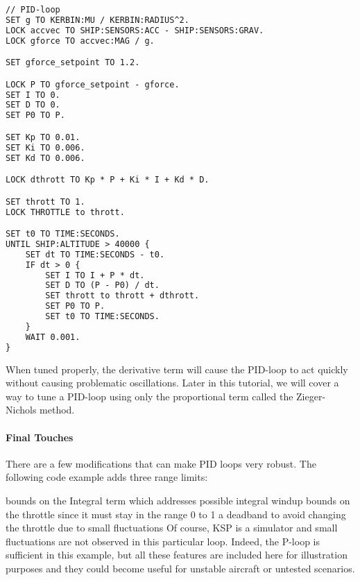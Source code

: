 \begin{lstlisting}[frame=single,language=XML]
// PID-loop
SET g TO KERBIN:MU / KERBIN:RADIUS^2.
LOCK accvec TO SHIP:SENSORS:ACC - SHIP:SENSORS:GRAV.
LOCK gforce TO accvec:MAG / g.

SET gforce_setpoint TO 1.2.

LOCK P TO gforce_setpoint - gforce.
SET I TO 0.
SET D TO 0.
SET P0 TO P.

SET Kp TO 0.01.
SET Ki TO 0.006.
SET Kd TO 0.006.

LOCK dthrott TO Kp * P + Ki * I + Kd * D.

SET thrott TO 1.
LOCK THROTTLE to thrott.

SET t0 TO TIME:SECONDS.
UNTIL SHIP:ALTITUDE > 40000 {
    SET dt TO TIME:SECONDS - t0.
    IF dt > 0 {
        SET I TO I + P * dt.
        SET D TO (P - P0) / dt.
        SET thrott to thrott + dthrott.
        SET P0 TO P.
        SET t0 TO TIME:SECONDS.
    }
    WAIT 0.001.
}
\end{lstlisting} 

When tuned properly, the derivative term will cause the PID-loop to act quickly without causing problematic oscillations. Later in this tutorial, we will cover a way to tune a PID-loop using only the proportional term called the Zieger-Nichols method.

\paragraph{Final Touches}
There are a few modifications that can make PID loops very robust. The following code example adds three range limits:

bounds on the Integral term which addresses possible integral windup
bounds on the throttle since it must stay in the range 0 to 1
a deadband to avoid changing the throttle due to small fluctuations
Of course, KSP is a simulator and small fluctuations are not observed in this particular loop. Indeed, the P-loop is sufficient in this example, but all these features are included here for illustration purposes and they could become useful for unstable aircraft or untested scenarios.

